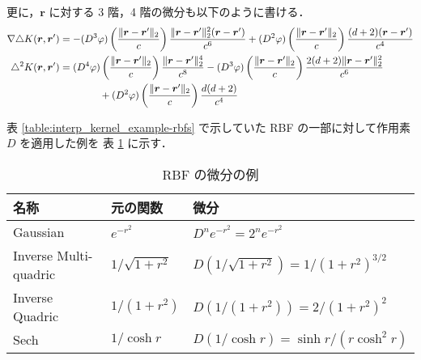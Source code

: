 更に，$\bm{r}$ に対する 3 階，4 階の微分も以下のように書ける．
\begin{align}
    \nabla \triangle K(\bm{r}, \bm{r}') & =
    -(D^3 \varphi)\left(\frac{\|\bm{r} - \bm{r}'\|_2}{c}\right)
    \frac{\|\bm{r} - \bm{r}'\|_2^2 (\bm{r} - \bm{r}')}{c^6}
    +(D^2 \varphi)\left(\frac{\|\bm{r} - \bm{r}'\|_2}{c}\right)
    \frac{(d+2)(\bm{r} - \bm{r}')}{c^4}
    \\
    \triangle^2 K(\bm{r}, \bm{r}')      & =
    (D^4 \varphi)\left(\frac{\|\bm{r} - \bm{r}'\|_2}{c}\right)
    \frac{\|\bm{r} - \bm{r}'\|_2^4}{c^8}
    -(D^3 \varphi)\left(\frac{\|\bm{r} - \bm{r}'\|_2}{c}\right)
    \frac{2(d+2)\|\bm{r} - \bm{r}'\|_2^2}{c^6}
    \notag                                  \\ &\hspace{4em}
    +(D^2 \varphi)\left(\frac{\|\bm{r} - \bm{r}'\|_2}{c}\right)
    \frac{d(d+2)}{c^4}
\end{align}

表 \ref{table:interp_kernel_example-rbfs} で示していた RBF の一部に対して作用素 $D$ を適用した例を
表 \ref{table:interp_kernel_rbf-derivatives} に示す．

\begin{table}[bp]
    \caption{RBF の微分の例}
    \label{table:interp_kernel_rbf-derivatives}
    \centering
    \begin{tabular}{lll}
        名称                    & 元の関数               & 微分                                             \\
        \hline
        Gaussian              & $e^{-r^2}$         & $D^n e^{-r^2} = 2^n e^{-r^2}$                  \\
        Inverse Multi-quadric & $1/\sqrt{1 + r^2}$ & $D (1/\sqrt{1 + r^2}) = 1/(1 + r^2)^{3/2}$     \\
        Inverse Quadric       & $1 / (1 + r^2)$    & $D (1 / (1 + r^2)) = 2/(1 + r^2)^2$            \\
        Sech                  & $1 / \cosh{r}$     & $D (1 / \cosh{r}) = \sinh{r} / (r \cosh^2{r})$
    \end{tabular}
\end{table}
